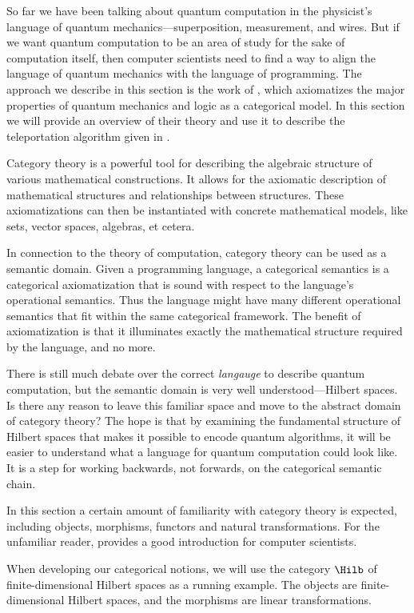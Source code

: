 So far we have been talking about quantum computation in the physicist's language
of quantum mechanics---superposition, measurement, and wires. 
But if we want quantum computation to be an area of study for the sake of
computation itself, then computer scientists need to find a way to align
the language of quantum mechanics with the language of programming.
The approach we describe in this section is the work of \cite{abramsky2009categorical},
which axiomatizes the major properties of quantum mechanics and logic as a categorical model.
In this section we will provide an overview of their theory and use it to describe the
teleportation algorithm given in .

Category theory is a powerful tool for describing the algebraic structure of
various mathematical constructions. It allows for the axiomatic description
of mathematical structures and relationships between structures. These axiomatizations
can then be instantiated with concrete mathematical models, like sets,
vector spaces, algebras, et cetera. 

In connection to the theory of computation, category theory can be used as a semantic
domain. Given a programming language, a categorical semantics is a categorical axiomatization
that is sound with respect to the language's operational semantics. 
Thus the language might have many different operational semantics that fit within the same
categorical framework. 
The benefit of axiomatization is that it illuminates exactly the mathematical structure
required by the language, and no more.

There is still much debate over the correct \emph{langauge} to describe quantum computation,
but the semantic domain is very well understood---Hilbert spaces.
Is there any reason to leave this familiar space and move to the abstract domain of category theory?
The hope is that by examining the fundamental structure of Hilbert spaces that makes it possible
to encode quantum algorithms, it will be easier to understand what a language for
quantum computation could look like. It is a step for working backwards, not forwards,
on the categorical semantic chain.

In this section a certain amount of familiarity with category theory is expected,
including objects, morphisms, functors and natural transformations. 
For the unfamiliar reader, \cite{pierce1991basic} provides a good introduction for
computer scientists.

When developing our categorical notions, we will use the category $\Hilb$ of finite-dimensional
Hilbert spaces as a running example. The objects are finite-dimensional Hilbert spaces,
and the morphisms are linear transformations. 

